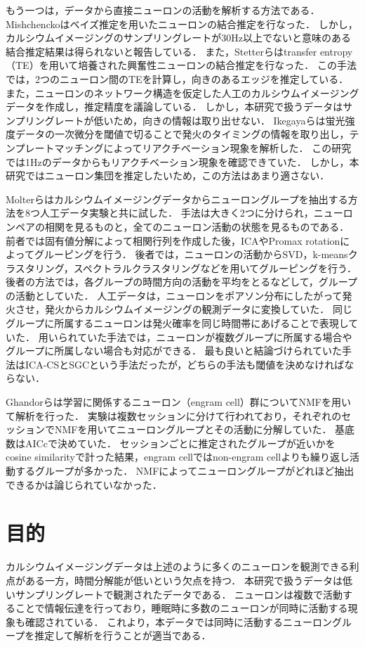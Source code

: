 もう一つは，データから直接ニューロンの活動を解析する方法である．
Mishchenckoはベイズ推定を用いたニューロンの結合推定を行なった\cite{Mishchencko2011}．
しかし，カルシウムイメージングのサンプリングレートが30Hz以上でないと意味のある結合推定結果は得られないと報告している．
また，Stetterらはtransfer entropy（TE）を用いて培養された興奮性ニューロンの結合推定を行なった\cite{Stetter2012}．
この手法では，2つのニューロン間のTEを計算し，向きのあるエッジを推定している．
また，ニューロンのネットワーク構造を仮定した人工のカルシウムイメージングデータを作成し，推定精度を議論している．
しかし，本研究で扱うデータはサンプリングレートが低いため，向きの情報は取り出せない．
Ikegayaらは蛍光強度データの一次微分を閾値で切ることで発火のタイミングの情報を取り出し，テンプレートマッチングによってリアクチベーション現象を解析した\cite{Ikegaya2004}．
この研究では1Hzのデータからもリアクチベーション現象を確認できていた．
しかし，本研究ではニューロン集団を推定したいため，この方法はあまり適さない．

Molterらはカルシウムイメージングデータからニューロングループを抽出する方法を8つ人工データ実験と共に試した\cite{Molter2018}．
手法は大きく2つに分けられ，ニューロンペアの相関を見るものと，全てのニューロン活動の状態を見るものである．
前者では固有値分解によって相関行列を作成した後，ICAやPromax rotationによってグルーピングを行う．
後者では，ニューロンの活動からSVD，k-meansクラスタリング，スペクトラルクラスタリングなどを用いてグルーピングを行う．
後者の方法では，各グループの時間方向の活動を平均をとるなどして，グループの活動としていた．
人工データは，ニューロンをポアソン分布にしたがって発火させ，発火からカルシウムイメージングの観測データに変換していた．
同じグループに所属するニューロンは発火確率を同じ時間帯にあげることで表現していた．
用いられていた手法では，ニューロンが複数グループに所属する場合やグループに所属しない場合も対応ができる．
最も良いと結論づけられていた手法はICA-CSとSGCという手法だったが，どちらの手法も閾値を決めなければならない．

Ghandorらは学習に関係するニューロン（engram cell）群についてNMFを用いて解析を行った\cite{Ghandour2019}．
実験は複数セッションに分けて行われており，それぞれのセッションでNMFを用いてニューロングループとその活動に分解していた．
基底数はAICcで決めていた．
セッションごとに推定されたグループが近いかをcosine similarityで計った結果，engram cellではnon-engram cellよりも繰り返し活動するグループが多かった．
NMFによってニューロングループがどれほど抽出できるかは論じられていなかった．

\section{目的}
カルシウムイメージングデータは上述のように多くのニューロンを観測できる利点がある一方，時間分解能が低いという欠点を持つ．
本研究で扱うデータは低いサンプリングレートで観測されたデータである．
ニューロンは複数で活動することで情報伝達を行っており，睡眠時に多数のニューロンが同時に活動する現象も確認されている．
これより，本データでは同時に活動するニューロングループを推定して解析を行うことが適当である．

